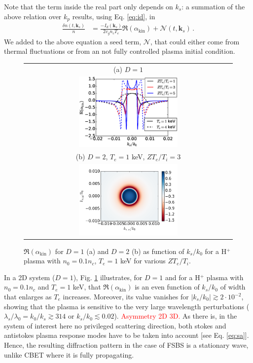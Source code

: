 \documentclass[
 reprint,
 amsmath,amssymb,
 aps,
]{revtex4-1}
\begin{document}
Note that the term inside the real part only depends on $k_s$:   a summation of the above relation over $k_p$ results, using Eq. \eqref{eq:id}, in  
\begin{align}
\frac{ \delta n (t,\mathbf{k}_s ) }{n}  &=   \frac{ -I_d(\mathbf{k}_s) }{ 2 v_g n_c T_e } 
 \Re \left( \alpha_\mathrm{kin}   \right)  + \mathcal{N}(t,\mathbf{k}_s)\, .\label{eq:drakef}
\end{align}
We added to the above equation a seed term, $\mathcal{N}$, that could either come from thermal fluctuations or from an not fully controlled plasma initial condition.  
\begin{figure}
\begin{tabular}{c}
(a) $D=1$\\
\includegraphics[width=0.49\textwidth]{akin.eps}\\
(b) $D=2$, $T_e=1$ keV, $ZT_e/T_i=3$\\
\includegraphics[width=0.49\textwidth]{akinD2.png}
\end{tabular}
\caption{ \label{fig:akin}  
 $\Re \left( \alpha_\mathrm{kin}   \right)$ for $D=1$ (a) and $D=2$ (b) as function of $k_s/k_0$ for a H$^{+}$ plasma with $n_0=0.1n_c$, $T_e =1$ keV for various $ZT_e/T_i$. 
 }
\end{figure}
In a 2D system ($D=1$), Fig. \ref{fig:akin} illustrates, for $D=1$ and for  a H$^{+}$ plasma with $n_0=0.1n_c$ and  $T_e =1$ keV, that $\Re \left( \alpha_\mathrm{kin}   \right)$ is an even function  of $k_s/k_0$ of width that enlarges as  $T_e$ increases. Moreover, its value vanishes for $\vert k_s/k_0 \vert  \gtrsim 2 \cdot 10^{-2}$, showing that the plasma is sensitive  to the very large wavelength perturbations ($\lambda_s/\lambda_0=k_0/k_s\gtrsim 314 $ or $k_s/k_0\lesssim 0.02$).
\textcolor{red}{Asymmetry 2D 3D.}
As there is, in  the system of interest here no privileged scattering direction, both stokes and antistokes plasma response modes have to be taken into account [see Eq. \eqref{eq:sa}]. Hence,  the resulting diffraction pattern  in the case of FSBS is  a stationary  wave, unlike CBET where it is fully propagating.
\end{document}

